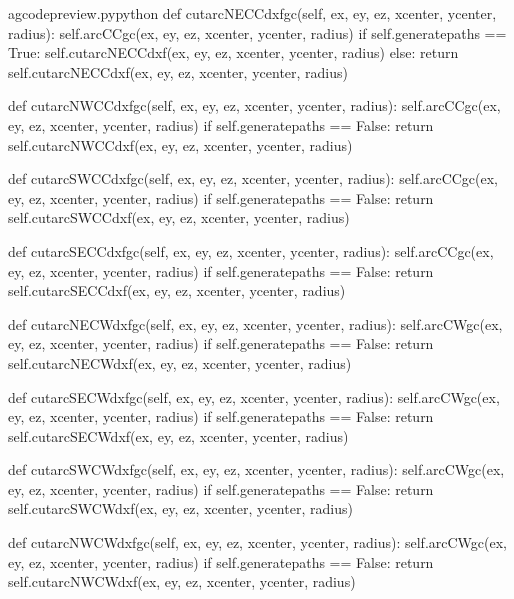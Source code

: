 \documentclass{ltxdoc}
\begin{document}
\lstset{firstnumber=\thegcpy}
\begin{writecode}{a}{gcodepreview.py}{python}
    def cutarcNECCdxfgc(self, ex, ey, ez, xcenter, ycenter, radius):
        self.arcCCgc(ex, ey, ez, xcenter, ycenter, radius)
        if self.generatepaths == True:
            self.cutarcNECCdxf(ex, ey, ez, xcenter, ycenter, radius)
        else:
            return self.cutarcNECCdxf(ex, ey, ez, xcenter, ycenter, radius)

    def cutarcNWCCdxfgc(self, ex, ey, ez, xcenter, ycenter, radius):
        self.arcCCgc(ex, ey, ez, xcenter, ycenter, radius)
        if self.generatepaths == False:
            return self.cutarcNWCCdxf(ex, ey, ez, xcenter, ycenter, radius)

    def cutarcSWCCdxfgc(self, ex, ey, ez, xcenter, ycenter, radius):
        self.arcCCgc(ex, ey, ez, xcenter, ycenter, radius)
        if self.generatepaths == False:
            return self.cutarcSWCCdxf(ex, ey, ez, xcenter, ycenter, radius)

    def cutarcSECCdxfgc(self, ex, ey, ez, xcenter, ycenter, radius):
        self.arcCCgc(ex, ey, ez, xcenter, ycenter, radius)
        if self.generatepaths == False:
            return self.cutarcSECCdxf(ex, ey, ez, xcenter, ycenter, radius)

    def cutarcNECWdxfgc(self, ex, ey, ez, xcenter, ycenter, radius):
        self.arcCWgc(ex, ey, ez, xcenter, ycenter, radius)
        if self.generatepaths == False:
            return self.cutarcNECWdxf(ex, ey, ez, xcenter, ycenter, radius)

    def cutarcSECWdxfgc(self, ex, ey, ez, xcenter, ycenter, radius):
        self.arcCWgc(ex, ey, ez, xcenter, ycenter, radius)
        if self.generatepaths == False:
            return self.cutarcSECWdxf(ex, ey, ez, xcenter, ycenter, radius)

    def cutarcSWCWdxfgc(self, ex, ey, ez, xcenter, ycenter, radius):
        self.arcCWgc(ex, ey, ez, xcenter, ycenter, radius)
        if self.generatepaths == False:
            return self.cutarcSWCWdxf(ex, ey, ez, xcenter, ycenter, radius)

    def cutarcNWCWdxfgc(self, ex, ey, ez, xcenter, ycenter, radius):
        self.arcCWgc(ex, ey, ez, xcenter, ycenter, radius)
        if self.generatepaths == False:
            return self.cutarcNWCWdxf(ex, ey, ez, xcenter, ycenter, radius)

\end{writecode}
\addtocounter{gcpy}{32}
\end{document}
